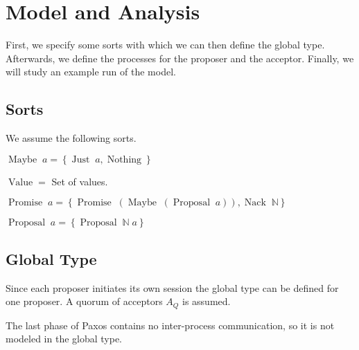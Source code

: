 \chapter{Model and Analysis}
First, we specify some sorts with which we can then define the global type.
Afterwards, we define the processes for the proposer and the acceptor.
Finally, we will study an example run of the model.

\section{Sorts}
\newcommand{\Maybe}[1]{\operatorname{Maybe}\; #1}
\newcommand{\Just}[1]{\operatorname{Just}\; #1}
\newcommand{\Nothing}[0]{\operatorname{Nothing}}
\newcommand{\Or}[0]{\; | \;}
\newcommand{\Promise}[1]{\operatorname{Promise}\; #1}
\newcommand{\Proposal}[1]{\operatorname{Proposal}\; #1}
\newcommand{\ProposalC}[2]{\operatorname{Proposal}\; #1\; #2}
\newcommand{\Nack}[1]{\operatorname{Nack}\; #1}
\newcommand{\Value}[0]{\operatorname{Value}}

\newcommand{\Curly}[1]{\left\{#1\right\}}
\newcommand{\Paren}[1]{\left(#1\right)}

We assume the following sorts.

$\Maybe{a} = \Curly{\Just{a}, \Nothing}$

$\Value =$ Set of values.

$\Promise{a} = \Curly{\Promise{\Paren{\Maybe{\Paren{\Proposal{a}}}}}, \Nack{\mathbb{N}}}$

$\Proposal{a} = \Curly{\ProposalC{\mathbb{N}}{a}}$

\section{Global Type}
\newcommand{\DotForall}[1]{\bigodot_{#1}\;}
\newcommand{\SendUnreliableG}[4]{#1 \to_u #2 : #3 \left\langle #4 \right\rangle}
\newcommand{\SendWeaklyG}[3]{#1 \to_w #2 : #3}

\newcommand{\Accept}[0]{\mathnormal{Accept}}
\newcommand{\Restart}[0]{\mathnormal{Restart}}
\newcommand{\Abort}[0]{\mathnormal{Abort}}

\newcommand{\Mu}[1]{\left(\mu #1\right)}

Since each proposer initiates its own session the global type can be defined for one proposer.
A quorum of acceptors $A_Q$ is assumed.

The last phase of Paxos contains no inter-process communication, so it is not modeled in the global type.

